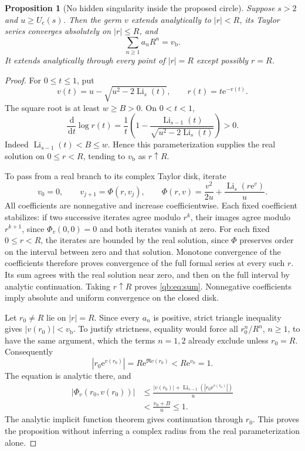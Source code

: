 \documentclass[11pt,a4paper]{article}
\newtheorem{proposition}[theorem]{Proposition}
\theoremstyle{definition}\newtheorem{definition}[theorem]{Definition}
\theoremstyle{remark}\newtheorem{remark}[theorem]{Remark}
\newcommand{\Li}{\operatorname{Li}}
\newcommand{\ee}{\mathrm e}
\newcommand{\dd}{\,\mathrm d}
\newcommand{\Uc}{U_{\mathrm c}}
\newcommand{\vb}{v_{\mathrm b}}
\numberwithin{equation}{section}
\begin{document}
\begin{proposition}[No hidden singularity inside the proposed circle]
\label{qb:prop:global}
Suppose $s>2$ and $u\ge\Uc(s)$. Then the germ $v$ extends analytically to
$|r|<R$, its Taylor series converges absolutely on $|r|\le R$, and
\begin{equation}\label{qb:eq:sum}
 \sum_{n\ge1}a_nR^n=\vb.
\end{equation}
It extends analytically through every point of $|r|=R$ except possibly
$r=R$.
\end{proposition}
\begin{proof}
For $0\le t\le1$, put
\[
 v(t)=u-\sqrt{u^2-2\Li_s(t)},\qquad r(t)=t\ee^{-v(t)}.
\]
The square root is at least $w\ge B>0$. On $0<t<1$,
\begin{equation}\label{qb:eq:monotone}
 \frac{\dd}{\dd t}\log r(t)=\frac1t
 \left(1-\frac{\Li_{s-1}(t)}{\sqrt{u^2-2\Li_s(t)}}\right)>0.
\end{equation}
Indeed $\Li_{s-1}(t)<B\le w$. Hence this parameterization supplies the
real solution on $0\le r<R$, tending to $\vb$ as $r\uparrow R$.

To pass from a real branch to its complex Taylor disk, iterate
\[
 v_0=0,\qquad
 v_{j+1}=\Phi(r,v_j),\qquad
 \Phi(r,v)=\frac{v^2}{2u}+\frac{\Li_s(r\ee^v)}u.
\]
All coefficients are nonnegative and increase coefficientwise. Each fixed
coefficient stabilizes: if two successive iterates agree modulo $r^k$,
their images agree modulo $r^{k+1}$, since $\Phi_v(0,0)=0$ and both
iterates vanish at zero. For each fixed $0\le r<R$, the iterates are
bounded by the real solution, since $\Phi$ preserves order on the interval
between zero and that solution. Monotone convergence of the coefficients
therefore proves convergence of the full formal series at every such $r$.
Its sum agrees with the real solution near zero, and then on the full
interval by analytic continuation. Taking $r\uparrow R$ proves
\eqref{qb:eq:sum}. Nonnegative coefficients imply absolute and uniform
convergence on the closed disk.

Let $r_0\ne R$ lie on $|r|=R$. Since every $a_n$ is positive, strict
triangle inequality gives $|v(r_0)|<\vb$. To justify strictness, equality
would force all $r_0^n/R^n$, $n\ge1$, to have the same argument, which the
terms $n=1,2$ already exclude unless $r_0=R$. Consequently
\[
 |r_0\ee^{v(r_0)}|=R\ee^{\Re v(r_0)}<R\ee^{\vb}=1.
\]
The equation is analytic there, and
\begin{align*}
 |\Phi_v(r_0,v(r_0))|
 &\le\frac{|v(r_0)|+\Li_{s-1}(|r_0\ee^{v(r_0)}|)}u\\
 &<\frac{\vb+B}{u}\le1.
\end{align*}
The analytic implicit function theorem gives continuation through $r_0$.
This proves the proposition without inferring a complex radius from the
real parameterization alone.
\end{proof}
\end{document}
